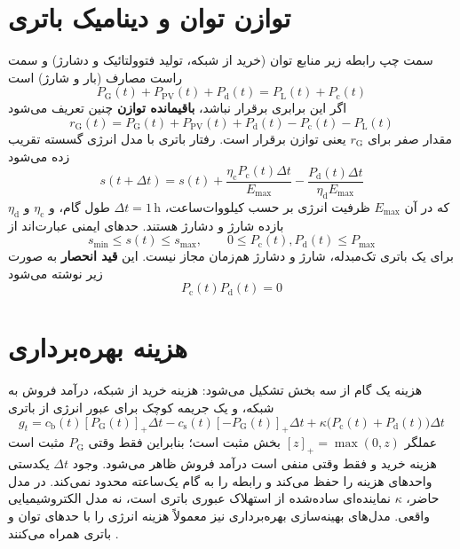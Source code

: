 \section{توازن توان و دینامیک باتری}
سمت چپ رابطه زیر منابع توان (خرید از شبکه، تولید فتوولتائیک و دشارژ) و سمت راست مصارف (بار و شارژ) است
\begin{equation}
  P_{\mathrm{G}}(t)+P_{\mathrm{PV}}(t)+P_{\mathrm{d}}(t)=P_{\mathrm{L}}(t)+P_{\mathrm{c}}(t)
  \label{eq:power-balance}
\end{equation}
اگر این برابری برقرار نباشد، \textbf{باقیمانده توازن} چنین تعریف می‌شود
\begin{equation}
  r_{\mathrm{G}}(t)=P_{\mathrm{G}}(t)+P_{\mathrm{PV}}(t)+P_{\mathrm{d}}(t)-P_{\mathrm{c}}(t)-P_{\mathrm{L}}(t)
  \label{eq:power-residual}
\end{equation}
مقدار صفر برای $r_{\mathrm{G}}$ یعنی توازن برقرار است. رفتار باتری با مدل انرژی گسسته تقریب زده می‌شود
\begin{equation}
  s(t+\Delta t)=s(t)+\frac{\eta_{\mathrm{c}}P_{\mathrm{c}}(t)\Delta t}{E_{\max}}-\frac{P_{\mathrm{d}}(t)\Delta t}{\eta_{\mathrm{d}}E_{\max}}
  \label{eq:soc-dynamics}
\end{equation}
که در آن $E_{\max}$ ظرفیت انرژی بر حسب کیلووات‌ساعت، $\Delta t=1\,\mathrm{h}$ طول گام، و $\eta_{\mathrm{c}}$ و $\eta_{\mathrm{d}}$ بازده شارژ و دشارژ هستند. حدهای ایمنی عبارت‌اند از
\begin{equation}
  s_{\min}\leq s(t)\leq s_{\max},\qquad
  0\leq P_{\mathrm{c}}(t),P_{\mathrm{d}}(t)\leq P_{\max}
  \label{eq:soc-bounds}
\end{equation}
برای یک باتری تک‌مبدله، شارژ و دشارژ هم‌زمان مجاز نیست. این \textbf{قید انحصار} به صورت زیر نوشته می‌شود
\begin{equation}
  P_{\mathrm{c}}(t)P_{\mathrm{d}}(t)=0
  \label{eq:exclusivity}
\end{equation}

\section{هزینه بهره‌برداری}
هزینه یک گام از سه بخش تشکیل می‌شود: هزینه خرید از شبکه، درآمد فروش به شبکه، و یک جریمه کوچک برای عبور انرژی از باتری
\begin{equation}
  g_{t}=c_{\mathrm{b}}(t)[P_{\mathrm{G}}(t)]_{+}\Delta t
  -c_{\mathrm{s}}(t)[-P_{\mathrm{G}}(t)]_{+}\Delta t
  +\kappa\bigl(P_{\mathrm{c}}(t)+P_{\mathrm{d}}(t)\bigr)\Delta t
  \label{eq:step-cost}
\end{equation}
عملگر $[z]_{+}=\max(0,z)$ بخش مثبت است؛ بنابراین فقط وقتی $P_{\mathrm{G}}$ مثبت است هزینه خرید و فقط وقتی منفی است درآمد فروش ظاهر می‌شود. وجود $\Delta t$ یکدستی واحدهای هزینه را حفظ می‌کند و رابطه را به گام یک‌ساعته محدود نمی‌کند. در مدل حاضر، $\kappa$ نماینده‌ای ساده‌شده از استهلاک عبوری باتری است، نه مدل الکتروشیمیایی واقعی. مدل‌های بهینه‌سازی بهره‌برداری نیز معمولاً هزینه انرژی را با حدهای توان و  باتری همراه می‌کنند .

